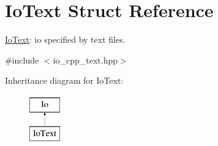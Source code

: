 \hypertarget{structIoText}{}\section{Io\+Text Struct Reference}
\label{structIoText}


\mbox{\hyperlink{structIoText}{Io\+Text}}\+: io specified by text files.  




{\ttfamily \#include $<$io\+\_\+cpp\+\_\+text.\+hpp$>$}

Inheritance diagram for Io\+Text\+:\begin{figure}[H]
\begin{center}
\leavevmode
\includegraphics[height=2.000000cm]{structIoText}
\end{center}
\end{figure}
